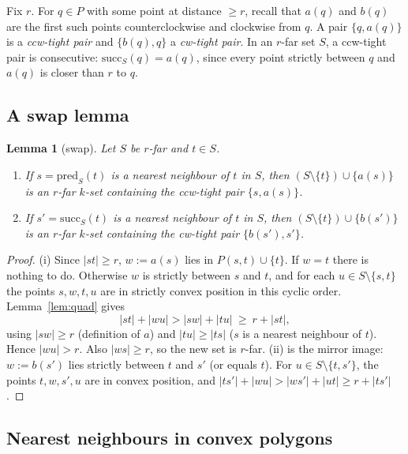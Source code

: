 \documentclass[11pt,a4paper]{article}
\newtheorem{lemma}[theorem]{Lemma}
\theoremstyle{definition}
\newcommand{\arc}[2]{P(#1,#2)}
\begin{document}
Fix $r$. For $q\in P$ with some point at distance $\ge r$, recall that $a(q)$
and $b(q)$ are the first such points counterclockwise and clockwise from $q$.
A pair $\{q,a(q)\}$ is a \emph{ccw-tight pair} and $\{b(q),q\}$ a
\emph{cw-tight pair}. In an $r$-far set $S$, a ccw-tight pair is consecutive:
$\mathrm{succ}_S(q)=a(q)$, since every point strictly between $q$ and $a(q)$ is
closer than $r$ to $q$.

\subsection{A swap lemma}

\begin{lemma}[swap]\label{lem:swap}
Let $S$ be $r$-far and $t\in S$.
\begin{enumerate}[label=(\roman*)]
\item If $s=\mathrm{pred}_S(t)$ is a nearest neighbour of $t$ in $S$, then
  $(S\setminus\{t\})\cup\{a(s)\}$ is an $r$-far $k$-set containing the
  ccw-tight pair $\{s,a(s)\}$.
\item If $s'=\mathrm{succ}_S(t)$ is a nearest neighbour of $t$ in $S$, then
  $(S\setminus\{t\})\cup\{b(s')\}$ is an $r$-far $k$-set containing the
  cw-tight pair $\{b(s'),s'\}$.
\end{enumerate}
\end{lemma}
\begin{proof}
(i) Since $|st|\ge r$, $w:=a(s)$ lies in $\arc st\cup\{t\}$. If $w=t$ there
is nothing to do. Otherwise $w$ is strictly between $s$ and $t$, and for each
$u\in S\setminus\{s,t\}$ the points $s,w,t,u$ are in strictly convex position
in this cyclic order. Lemma~\ref{lem:quad} gives
\[
  |st|+|wu|>|sw|+|tu|\ \ge\ r+|st|,
\]
using $|sw|\ge r$ (definition of $a$) and $|tu|\ge|ts|$ ($s$ is a nearest
neighbour of $t$). Hence $|wu|>r$. Also $|ws|\ge r$, so the new set is
$r$-far. (ii) is the mirror image: $w:=b(s')$ lies strictly between $t$ and
$s'$ (or equals $t$). For $u\in S\setminus\{t,s'\}$, the points $t,w,s',u$ are
in convex position, and $|ts'|+|wu|>|ws'|+|ut|\ge r+|ts'|$.
\end{proof}

\subsection{Nearest neighbours in convex polygons}
\end{document}
